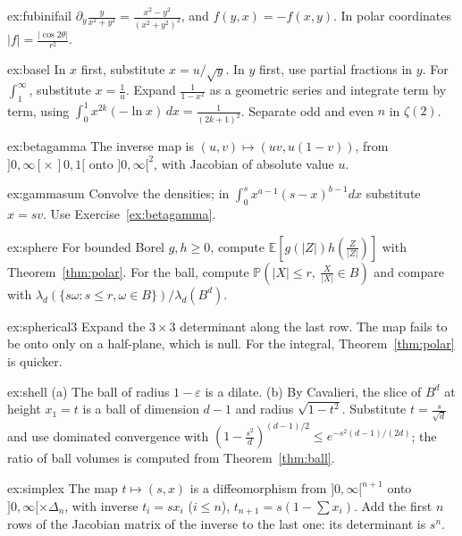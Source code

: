 \begin{hint}{ex:fubinifail}
$\partial_y\frac y{x^2+y^2}=\frac{x^2-y^2}{(x^2+y^2)^2}$, and $f(y,x)=-f(x,y)$. In polar coordinates $|f|=\frac{|\cos2\theta|}{r^2}$.
\end{hint}
\begin{hint}{ex:basel}
In $x$ first, substitute $x=u/\sqrt y$. In $y$ first, use partial fractions in $y$. For $\int_1^\infty$, substitute $x=\frac1u$. Expand $\frac1{1-x^2}$ as a geometric series and integrate term by term,
using $\int_0^1x^{2k}(-\ln x)\,dx=\frac1{(2k+1)^2}$. Separate odd and even $n$ in $\zeta(2)$.
\end{hint}
\begin{hint}{ex:betagamma}
The inverse map is $(u,v)\mapsto(uv,u(1-v))$, from $]0,\infty[\times\,]0,1[$ onto $]0,\infty[^2$, with Jacobian of absolute value $u$.
\end{hint}
\begin{hint}{ex:gammasum}
Convolve the densities; in $\int_0^sx^{a-1}(s-x)^{b-1}dx$ substitute $x=sv$. Use Exercise~\ref{ex:betagamma}.
\end{hint}
\begin{hint}{ex:sphere}
For bounded Borel $g,h\ge0$, compute $\mathbb E[g(|Z|)h(\frac Z{|Z|})]$ with Theorem~\ref{thm:polar}. For the ball, compute $\mathbb P(|X|\le r,\ \frac X{|X|}\in B)$ and compare with
$\lambda_d(\{s\omega:s\le r,\omega\in B\})/\lambda_d(B^d)$.
\end{hint}
\begin{hint}{ex:spherical3}
Expand the $3\times3$ determinant along the last row. The map fails to be onto only on a half-plane, which is null. For the integral, Theorem~\ref{thm:polar} is quicker.
\end{hint}
\begin{hint}{ex:shell}
(a) The ball of radius $1-\varepsilon$ is a dilate. (b) By Cavalieri, the slice of $B^d$ at height $x_1=t$ is a ball of dimension $d-1$ and radius $\sqrt{1-t^2}$. Substitute $t=\frac s{\sqrt d}$
and use dominated convergence with $(1-\frac{s^2}d)^{(d-1)/2}\le e^{-s^2(d-1)/(2d)}$; the ratio of ball volumes is computed from Theorem~\ref{thm:ball}.
\end{hint}
\begin{hint}{ex:simplex}
The map $t\mapsto(s,x)$ is a diffeomorphism from $]0,\infty[^{n+1}$ onto $]0,\infty[\times\Delta_n$, with inverse $t_i=sx_i$ ($i\le n$), $t_{n+1}=s(1-\sum x_i)$. Add the first $n$ rows of the Jacobian matrix of
the inverse to the last one: its determinant is $s^n$.
\end{hint}

